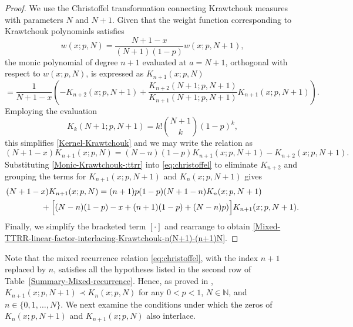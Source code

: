 \documentclass[final,3p,times,12pt]{elsarticle}
\numberwithin{equation}{section}  %
\begin{document}
\begin{proof}
	We use the Christoffel transformation \cite[page 35]{Chiharabook} connecting Krawtchouk measures with parameters $N$ and $N+1$. Given that the weight function corresponding to Krawtchouk  polynomials  satisfies
	\begin{equation*}
		w(x; p, N) = \frac{N+1-x}{(N+1)(1-p)} w(x; p, N+1),
	\end{equation*}
	the monic polynomial of degree $n+1$ evaluated at $a = N+1$, orthogonal with respect to $w(x; p, N)$, is expressed as 	
	$\displaystyle 	K_{n+1}(x; p, N) $
	\begin{equation}\label{Kernel-Krawtchouk}
		= \frac{1}{N+1-x} \left( -K_{n+2}(x; p, N+1) + \frac{K_{n+2}(N+1; p, N+1)}{K_{n+1}(N+1; p, N+1)} K_{n+1}(x; p, N+1) \right).
	\end{equation}
	Employing the evaluation
	\begin{equation*}
		K_k(N+1; p, N+1) = k! \binom{N+1}{k} (1-p)^k,
	\end{equation*}
	this simplifies  \eqref{Kernel-Krawtchouk} and we may write the relation as
	\begin{equation} \label{eq:christoffel}
		(N+1-x) K_{n+1}(x; p, N) = (N-n)(1-p) K_{n+1}(x; p, N+1) - K_{n+2}(x; p, N+1).
	\end{equation}
	Substituting \eqref{Monic-Krawtchouk-:ttrr} into \eqref{eq:christoffel} to eliminate $K_{n+2}$ and grouping the terms for $K_{n+1}(x;p, N+1)$ and $K_n(x; p,N+1)$ gives
	\begin{align*}
		\nonumber	&(N+1-x) K_{n+1}(x;p, N) = (n+1)p(1-p)(N+1-n) K_n(x;p, N+1) \\&\hspace{1.5cm}+ \Big[ (N-n)(1-p) - x + (n+1)(1-p) +(N-n)p)  \Big] K_{n+1}(x;p, N+1).
	\end{align*}
	Finally, we simplify the bracketed term $[\cdot]$ and rearrange to obtain \eqref{Mixed-TTRR-linear-factor-interlacing-Krawtchouk-n(N+1)-(n+1)N}.
\end{proof}
Note that the mixed recurrence relation \eqref{eq:christoffel}, with the index
$n+1$ replaced by $n$, satisfies all the hypotheses listed in the second row of
Table~\ref{Summary-Mixed-recurrence}. Hence, as proved in \cite{Jordaan-Tookos-ANM-2009}, $K_{n+1}(x;p,N+1)\prec K_{n}(x;p,N)$
for any $0<p<1$, $N\in\mathbb{N}$,
and $n\in\{0,1,\ldots,N\}$.
We next examine the conditions under which the
zeros of $K_{n}(x;p,N+1)$ and $K_{n+1}(x;p,N)$ also interlace.
\end{document}
